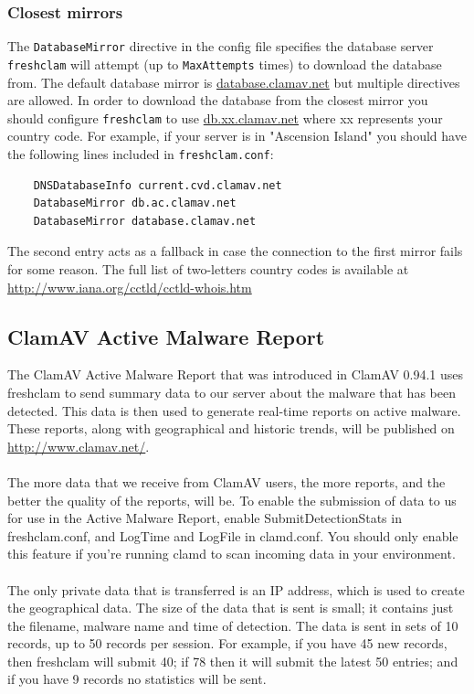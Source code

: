 \documentclass[a4paper,titlepage,12pt]{article}
\begin{document}
    \subsubsection{Closest mirrors}
    The \verb+DatabaseMirror+ directive in the config file specifies the
    database server \verb+freshclam+ will attempt (up to \verb+MaxAttempts+
    times) to download the database from. The default database mirror
    is \url{database.clamav.net} but multiple directives are allowed.
    In order to download the database from the closest mirror you should  
    configure \verb+freshclam+ to use \url{db.xx.clamav.net} where xx
    represents your country code. For example, if your server is in "Ascension
    Island" you should have the following lines included in \verb+freshclam.conf+:
    \begin{verbatim}
	DNSDatabaseInfo current.cvd.clamav.net
	DatabaseMirror db.ac.clamav.net
	DatabaseMirror database.clamav.net
    \end{verbatim}
    The second entry acts as a fallback in case the connection to the first
    mirror fails for some reason. The full list of two-letters country codes
    is available at \url{http://www.iana.org/cctld/cctld-whois.htm}

    \subsection{ClamAV Active Malware Report}

    The ClamAV Active Malware Report that was introduced in ClamAV 0.94.1 uses
    freshclam to send summary data to our server about the malware that has
    been detected. This data is then used to generate real-time reports on
    active malware. These reports, along with geographical and historic trends,
    will be published on \url{http://www.clamav.net/}.
    \\\\
    The more data that we receive from ClamAV users, the more reports, and the
    better the quality of the reports, will be. To enable the submission of
    data to us for use in the Active Malware Report, enable
    SubmitDetectionStats in freshclam.conf, and LogTime and LogFile in
    clamd.conf. You should only enable this feature if you're running clamd
    to scan incoming data in your environment.
    \\\\
    The only private data that is transferred is an IP address, which is used
    to create the geographical data. The size of the data that is sent is small;
    it contains just the filename, malware name and time of detection. The data
    is sent in sets of 10 records, up to 50 records per session. For example,
    if you have 45 new records, then freshclam will submit 40; if 78 then it
    will submit the latest 50 entries; and if you have 9 records no statistics
    will be sent.
\end{document}
